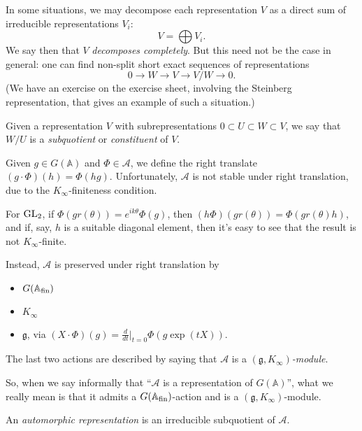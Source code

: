 \documentclass[reqno]{amsart} 
\begin{document}
In some situations, we may decompose each representation $V$ as a direct sum of irreducible representations $V_i$:
\begin{equation*}
  V = \bigoplus V_i.
\end{equation*}
We say then that $V$ \emph{decomposes completely}.  But this need not be the case in general: one can find non-split short exact sequences of representations
\begin{equation*}
  0 \rightarrow W \rightarrow V \rightarrow V / W \rightarrow 0.
\end{equation*}
(We have an exercise on the exercise sheet, involving the Steinberg representation, that gives an example of such a situation.)

Given a representation $V$ with subrepresentations $0 \subset U \subset W \subset V$, we say that $W / U$ is a \emph{subquotient} or \emph{constituent} of $V$.

Given $g \in G(\mathbb{A})$ and $\Phi \in \mathcal{A}$, we define the right translate $(g \cdot \Phi)(h) = \Phi(h g)$.  Unfortunately, $\mathcal{A}$ is not stable under right translation, due to the $K_\infty$-finiteness condition.
\begin{example}
  For $\operatorname{GL}_2$, if $\Phi(g r(\theta)) = e^{i k \theta} \Phi(g)$, then $(h \Phi)(g r(\theta)) = \Phi(g r(\theta) h)$, and if, say, $h$ is a suitable diagonal element, then it's easy to see that the result is not $K_\infty$-finite.
\end{example}

Instead, $\mathcal{A}$ is preserved under right translation by
\begin{itemize}
\item $G(\mathbb{A}_{\operatorname{fin}})$
\item $K_\infty$
\item $\mathfrak{g}$, via $(X \cdot \Phi)(g) = \frac{d}{d t} |_{t=0} \Phi(g \exp(t X))$.
\end{itemize}
The last two actions are described by saying that $\mathcal{A}$ is a $(\mathfrak{g}, K_\infty)$\emph{-module}.

So, when we say informally that ``$\mathcal{A}$ is a representation of $G(\mathbb{A})$'', what we really mean is that it admits a $G(\mathbb{A}_{\operatorname{fin}})$-action and is a $(\mathfrak{g}, K_\infty)$-module.

\begin{definition}
  An \emph{automorphic representation} is an irreducible subquotient of $\mathcal{A}$.
\end{definition}
\end{document}
